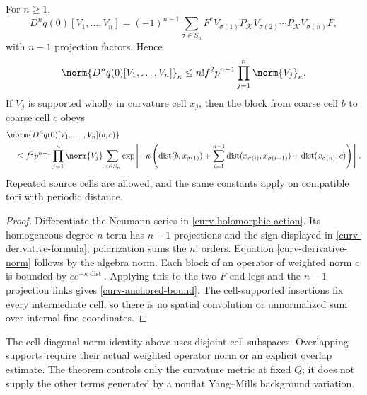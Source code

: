 \begin{corollary}
\label{curv-all-orders}
For $n\ge1$,
\begin{equation}\label{curv-derivative-formula}
 D^nq(0)[V_1,\ldots,V_n]
   =(-1)^{n-1}\sum_{\sigma\in S_n}
       F^*V_{\sigma(1)}P_{\mathcal K}V_{\sigma(2)}
       \cdots P_{\mathcal K}V_{\sigma(n)}F,
\end{equation}
with $n-1$ projection factors. Hence
\begin{equation}\label{curv-derivative-norm}
 \norm{D^nq(0)[V_1,\ldots,V_n]}_\kappa
       \le n!f^2p^{n-1}\prod_{j=1}^n\norm{V_j}_\kappa.
\end{equation}
If $V_j$ is supported wholly in curvature cell $x_j$, then the
block from coarse cell $b$ to coarse cell $c$ obeys
\begin{align}
 &\norm{D^nq(0)[V_1,\ldots,V_n](b,c)}\notag\\
 &\quad\le f^2p^{n-1}\prod_{j=1}^n\norm{V_j}
       \sum_{\sigma\in S_n}
       \exp\!\left[-\kappa\left(
          \operatorname{dist}(b,x_{\sigma(1)})
          +\sum_{i=1}^{n-1}\operatorname{dist}
                   (x_{\sigma(i)},x_{\sigma(i+1)})
          +\operatorname{dist}(x_{\sigma(n)},c)
                       \right)\right].
                       \label{curv-anchored-bound}
\end{align}
Repeated source cells are allowed, and the same constants apply
on compatible tori with periodic distance.
\end{corollary}

\begin{proof}
Differentiate the Neumann series in
\eqref{curv-holomorphic-action}. Its homogeneous degree-$n$ term
has $n-1$ projections and the sign displayed in
\eqref{curv-derivative-formula}; polarization sums the $n!$
orders. Equation \eqref{curv-derivative-norm} follows by the algebra
norm. Each block of an operator of weighted norm $c$ is bounded
by $ce^{-\kappa\operatorname{dist}}$. Applying this to the two
$F$ end legs and the $n-1$ projection links gives
\eqref{curv-anchored-bound}. The cell-supported insertions fix
every intermediate cell, so there is no spatial convolution
or unnormalized sum over internal fine coordinates.
\end{proof}

The cell-diagonal norm identity above uses disjoint cell subspaces.
Overlapping supports require their actual weighted operator norm
or an explicit overlap estimate. The theorem controls only the
curvature metric at fixed $Q$; it does not supply the other terms
generated by a nonflat Yang--Mills background variation.
